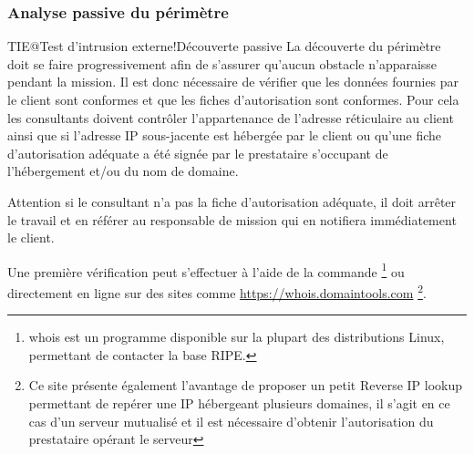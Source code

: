 \documentclass[twoside,a4paper,12pt,titlepage]{book}
\begin{document}
\subsubsection{Analyse passive du périmètre}
\begin{Define}{TIE@Test d'intrusion externe!Découverte passive} La découverte du périmètre doit se faire progressivement afin de s'assurer qu'aucun obstacle n'apparaisse pendant la mission. Il est donc nécessaire de vérifier que les données fournies par le client sont conformes et que les fiches d'autorisation sont conformes. Pour cela les consultants doivent contrôler l'appartenance de l'adresse réticulaire au client ainsi que si l'adresse IP sous-jacente est hébergée par le client ou qu'une fiche d'autorisation adéquate a été signée par le prestataire s'occupant de l'hébergement et/ou du nom de domaine.\end{Define}
\begin{Stop} Attention si le consultant n'a pas la fiche d'autorisation adéquate, il doit arrêter le travail et en référer au responsable de mission qui en notifiera immédiatement le client.\end{Stop}
	Une première vérification peut s'effectuer à l'aide de la commande \footnote{whois est un programme disponible sur la plupart des distributions Linux, permettant de contacter la base RIPE.} ou directement en ligne sur des sites comme \url{https://whois.domaintools.com} \footnote{Ce site présente également l'avantage de proposer un petit Reverse IP lookup permettant de repérer une IP hébergeant plusieurs domaines, il s'agit en ce cas d'un serveur mutualisé et il est nécessaire d'obtenir l'autorisation du prestataire opérant le serveur}.\\
\end{document}
